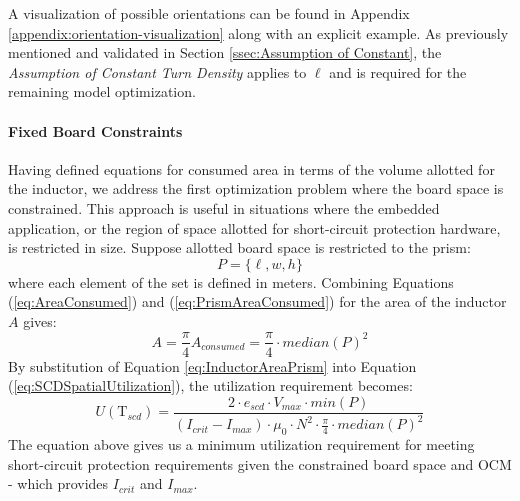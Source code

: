 A visualization of possible orientations can be found in Appendix \ref{appendix:orientation-visualization} along with an explicit example. As previously mentioned and validated in Section \ref{ssec:Assumption of Constant}, the \textit{Assumption of Constant Turn Density} applies to $\ell$ and is required for the remaining model optimization.


\paragraph{Fixed Board Constraints}

Having defined equations for consumed area in terms of the volume allotted for the inductor, we address the first optimization problem where the board space is constrained. This approach is useful in situations where the embedded application, or the region of space allotted for short-circuit protection hardware, is restricted in size. Suppose allotted board space is restricted to the prism:
\begin{equation}\label{eq:Prism2}
P = \{\ell, w, h\} \nonumber
\end{equation}
where each element of the set is defined in meters. Combining Equations (\ref{eq:AreaConsumed}) and (\ref{eq:PrismAreaConsumed}) for the area of the inductor $A$ gives:
\begin{equation}\label{eq:InductorAreaPrism}
A = \frac{\pi}{4} A_{consumed} = \frac{\pi}{4} \cdot median(P)^2 \nonumber
\end{equation}
By substitution of Equation \ref{eq:InductorAreaPrism} into Equation (\ref{eq:SCDSpatialUtilization}), the utilization requirement becomes:
\begin{equation}\label{eq:MinUtilizationPrism}
U(\mathrm{T}_{scd}) = \frac{2 \cdot e_{scd} \cdot V_{max} \cdot min(P)}{(I_{crit}-I_{max}) \cdot \mu_0 \cdot N^{2} \cdot \frac{\pi}{4} \cdot median(P)^2}
\end{equation}
The equation above gives us a minimum utilization requirement for meeting short-circuit protection requirements given the constrained board space and OCM - which provides $I_{crit}$ and $I_{max}$.

